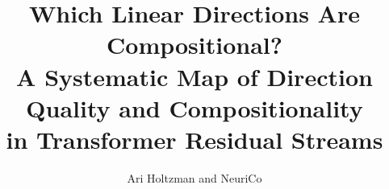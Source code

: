 \documentclass{article}
\title{Which Linear Directions Are Compositional? \\
A Systematic Map of Direction Quality and Compositionality \\
in Transformer Residual Streams}
\author{Ari Holtzman and NeuriCo}
\begin{document}
\maketitle

\begin{abstract}

\end{abstract}










\end{document}
